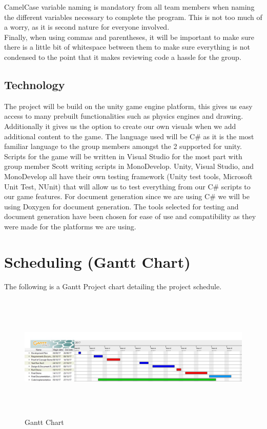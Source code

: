 \documentclass[12pt]{article}
\begin{document}
	CamelCase variable naming is mandatory from all team members when naming the different variables necessary to complete the program. This is not too much of a worry, as it is second nature for everyone involved. \\
	
	Finally, when using commas and parentheses, it will be important to make sure there is a little bit of whitespace between them to make sure everything is not condensed to the point that it makes reviewing code a hassle for the group. 


\subsection{Technology}
The project will be build on the unity game engine platform, this gives us easy access to many prebuilt functionalities such as physics engines and drawing. Additionally it gives us the option to create our own visuals when we add additional content to the game. The language used will be C\# as it is the most familiar language to the group members amongst the 2 supported for unity. Scripts for the game will be written in Visual Studio for the most part with group member Scott writing scripts in MonoDevelop. Unity, Visual Studio, and MonoDevelop all have their own testing framework (Unity test tools, Microsoft Unit Test, NUnit) that will allow us to test everything from our C\# scripts to our game features. For document generation since we are using C\# we will be using Doxygen for document generation. The tools selected for testing and document generation have been chosen for ease of use and compatibility as they were made for the platforms we are using. 


\section{Scheduling (Gantt Chart)}
The following is a Gantt Project chart detailing the project schedule.
\begin{figure}[h!]
\centering
\includegraphics[width = 14cm, height = 6cm]{GanttChart}
\caption{Gantt Chart}
\end{figure}
\end{document}
